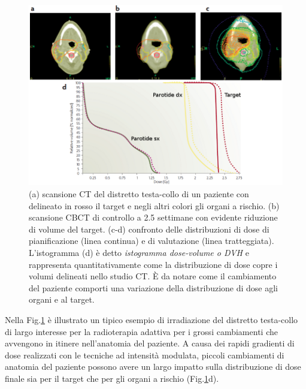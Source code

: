 \begin{figure}[!t]
\centering
\centerline{
\includegraphics[width=1.2\textwidth]{./cap3/HN_DVH.png}}
\caption{(a) scansione CT del distretto testa-collo di un paziente con delineato in rosso il target e negli altri colori gli organi a rischio. (b) scansione CBCT di controllo a 2.5 settimane con evidente riduzione di volume del target. (c-d) confronto delle distribuzioni di dose di pianificazione (linea continua) e di valutazione (linea tratteggiata). L'istogramma (d) è detto \textit{istogramma dose-volume o DVH} e rappresenta quantitativamente come la distribuzione di dose copre i volumi delineati nello studio CT. \`E da notare come il cambiamento del paziente comporti una variazione della distribuzione di dose agli organi e al target.}
\label{fig:HN_DVH}
\end{figure}

 Nella Fig.\ref{fig:HN_DVH} è illustrato un tipico esempio di irradiazione del distretto testa-collo di largo interesse per la radioterapia adattiva per i grossi cambiamenti che avvengono in itinere nell'anatomia del paziente. A causa dei rapidi gradienti di dose realizzati con le tecniche ad intensità modulata, piccoli cambiamenti di anatomia del paziente possono avere un largo impatto sulla distribuzione di dose finale sia per il target che per gli organi a rischio (Fig.\ref{fig:HN_DVH}d). \\
 

